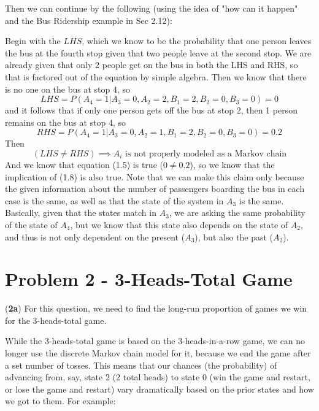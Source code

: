 \documentclass{article}
\begin{document}
Then we can continue by the following (using the idea of "how can it happen" and the Bus Ridership example in Sec 2.12):

Begin with the $LHS$, which we know to be the probability that one person leaves the bus at the fourth stop given that two people leave at the second stop.  We are already given that only 2 people get on the bus in both the LHS and RHS, so that is factored out of the equation by simple algebra.  Then we know that there is no one on the bus at stop 4, so
\begin{equation}
    LHS = P(A_4 = 1 | A_3 = 0, A_2 = 2, B_1 = 2, B_2 = 0, B_3 = 0) = 0
\end{equation}
and it follows that if only one person gets off the bus at stop 2, then 1 person remains on the bus at stop 4, so
\begin{equation}
    RHS = P(A_4 = 1 | A_3 = 0, A_2 = 1, B_1 = 2, B_2 = 0, B_3 = 0) = 0.2
\end{equation}
Then
\begin{equation}
    (LHS \neq RHS) \implies \text{$A_i$ is not properly modeled as a Markov chain}
\end{equation}
And we know that equation (1.5) is true ($0 \neq 0.2$), so we know that the implication of (1.8) is also true.  Note that we can make this claim only because the given information about the number of passengers boarding the bus in each case is the same, as well as that the state of the system in $A_3$ is the same.  Basically, given that the states match in $A_3$, we are asking the same probability of the state of $A_4$, but we know that this state also depends on the state of $A_2$, and thus is not only dependent on the present ($A_3$), but also the past ($A_2$).

\newpage
\section{Problem 2 - 3-Heads-Total Game}
\item(\textbf{2a})
For this question, we need to find the long-run proportion of games we win for the 3-heads-total game.

While the 3-heads-total game is based on the 3-heads-in-a-row game, we can no longer use the discrete Markov chain model for it, because we end the game after a set number of tosses.  This means that our chances (the probability) of advancing from, say, state 2 (2 total heads) to state 0 (win the game and restart, or lose the game and restart) vary dramatically based on the prior states and how we got to them.  For example:
\end{document}
